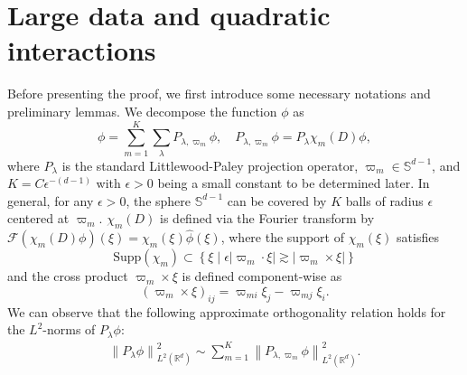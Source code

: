 \documentclass[10pt,twoside,a4paper]{article}
\numberwithin{equation}{section}\allowdisplaybreaks
\begin{document}
\section{Large data and	quadratic interactions}  \label{s_big}
Before presenting the proof, we first introduce some necessary notations and preliminary lemmas. We decompose the function \( \phi \) as
\[
\phi = \sum_{m=1}^K \sum_{\lambda} P_{\lambda,\varpi_m} \phi, \quad    P_{\lambda, \varpi_m} \phi = P_\lambda \chi_m(D) \phi,
\]
where \( P_\lambda \) is the standard Littlewood-Paley projection operator,   \( \varpi_m \in \mathbb{S}^{d-1} \), and \( K = C \epsilon^{-(d-1)} \) with \( \epsilon > 0 \) being a small constant to be determined later. In general, for any \( \epsilon > 0 \), the sphere \( \mathbb{S}^{d-1} \) can be covered by \( K \) balls of radius \( \epsilon \) centered at \( \varpi_m \).
\( \chi_m(D) \) is defined via the Fourier transform by \( \mathcal{F}(\chi_m(D)\phi)(\xi) = \chi_m(\xi) \widehat{\phi}(\xi) \), where the support of \( \chi_m(\xi) \) satisfies
\[
\mathrm{Supp}(\chi_m) \subset \left\{ \xi \;\big|\; \epsilon |\varpi_m \cdot \xi| \gtrsim |\varpi_m \times \xi| \right\}
\]
and the cross product \( \varpi_m \times \xi \) is defined component-wise as
\[
(\varpi_m \times \xi)_{ij} = \varpi_{mi} \xi_j - \varpi_{mj} \xi_i.
\]
We can observe that the following approximate orthogonality relation holds for the \( L^2 \)-norms of \( P_\lambda \phi \):  
\begin{align}
\left\| P_\lambda \phi \right\|_{L^{2}(\mathbb{R}^d)}^2 \sim \sum_{m=1}^K \left\| P_{\lambda, \varpi_m} \phi \right\|_{L^{2}(\mathbb{R}^d)}^2. \label{orth_relat}
\end{align}
\end{document}
